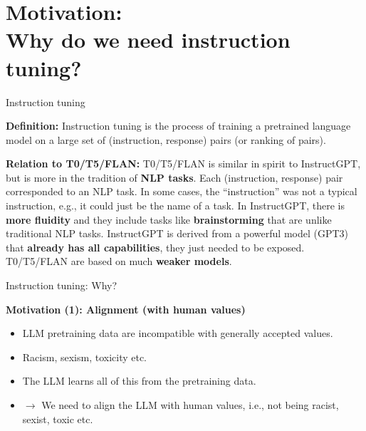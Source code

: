\documentclass[11pt,compress,t,notes=noshow, xcolor=table]{beamer}
\begin{document}



\section{Motivation:\\ Why do we need instruction tuning?}

\begin{vbframe}{Instruction tuning}

\vfill

\textbf{Definition:} Instruction tuning is the process of training a
	pretrained language model on a large set of
	(instruction, response) pairs (or ranking of pairs). 

\vfill

\textbf{Relation to T0/T5/FLAN:} 
T0/T5/FLAN is similar in spirit to InstructGPT, but
	is more in the tradition of \textbf{NLP tasks}. Each
	(instruction, response) pair corresponded to an NLP
	task. In some cases, the ``instruction'' was not a
	typical instruction, e.g., it could just be the name
	of a task. In  InstructGPT, there is \textbf{more
	fluidity} and they include tasks like
	\textbf{brainstorming} that are unlike traditional NLP
	tasks. InstructGPT is derived from a
	powerful model (GPT3) that \textbf{already has all
	capabilities}, they just needed to be
	exposed. T0/T5/FLAN are based on much \textbf{weaker models}.


\vfill

\end{vbframe}


\begin{vbframe}{Instruction tuning: Why?}

\vfill

\textbf{Motivation (1): Alignment (with human values)}

	\begin{itemize}
		\item LLM pretraining data are incompatible
		with generally accepted values.
		\item Racism, sexism, toxicity etc.
\item The LLM learns all of this from the pretraining data.
		\item $\rightarrow$ We need to align the LLM
		with human values, i.e., not being racist,
                sexist, toxic etc.
	\end{itemize}

\vfill

\end{vbframe}
\end{document}
